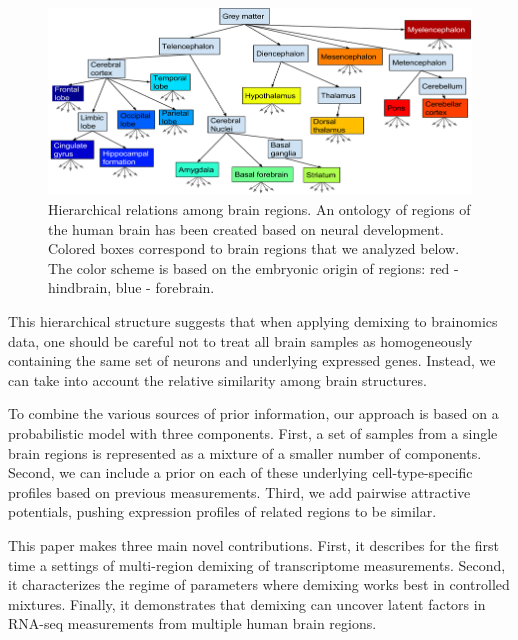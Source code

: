\documentclass{article} %
\begin{document}
\begin{figure}[!hbt]
  \begin{minipage}[c]{0.65\textwidth}
    \includegraphics[width=\textwidth]{tree}
  \end{minipage}\hfill
  \begin{minipage}[c]{0.3\textwidth}
    \caption{Hierarchical relations among brain regions. An ontology of regions of the human brain has been created based on neural development. Colored boxes correspond to brain regions that we analyzed below. The color scheme is based on the embryonic origin of regions: red - hindbrain, blue - forebrain.} 
    \label{fig:bro}
  \end{minipage}
\end{figure}

This hierarchical structure suggests that when applying demixing to brainomics data, one should be careful not to treat all brain samples as homogeneously containing the same set of neurons and underlying expressed genes. Instead, we can take into account the relative similarity among brain structures. 

To combine the various sources of prior information, our approach is based on a probabilistic model with three components. First, a set of samples from a single brain regions is represented as a mixture of a smaller number of components. Second, we can include a prior on each of these underlying cell-type-specific profiles based on previous measurements. Third, we add pairwise attractive potentials, pushing expression profiles of related regions to be similar.
 
This paper makes three main novel contributions. First, it describes for the first time a settings of multi-region demixing of transcriptome measurements. Second, it characterizes the regime of parameters where demixing works best in controlled mixtures. Finally, it demonstrates that demixing can uncover latent factors in RNA-seq measurements from multiple human brain regions.
 
\end{document}
